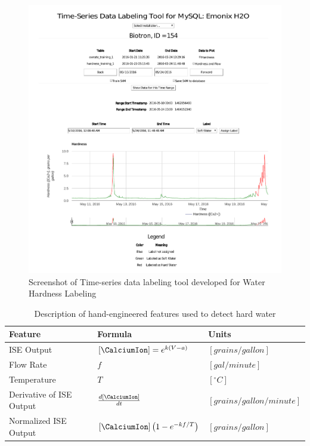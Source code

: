\begin{figure}[!t]
\includegraphics[width=\textwidth]{water/hardnesslabelingtool2.pdf}
\caption{Screenshot of Time-series data labeling tool developed for Water Hardness Labeling}
\label{fig:hardnesslabelingtool}
\end{figure}

\begin{table}
\centering
    \begin{tabularx}{\textwidth}{l || X || X }
    \textbf{Feature} & \textbf{Formula} & \textbf{Units} \\
    \hline
    ISE Output &  $[\CalciumIon] = e^{k (V - a)}$ & $[grains/gallon]$ \\
    Flow Rate &  $f$ & $[gal/minute]$ \\
    Temperature & $T$ & $[^\circ C]$ \\
    Derivative of ISE Output & $\frac{d [\CalciumIon]}{dt}$ & $[grains/gallon/minute]$ \\
    Normalized ISE Output & $[\CalciumIon] \left(  1 - e^{-k f / T}\right) $ & $[grains/gallon]$ \\
    \end{tabularx}
\caption{Description of hand-engineered features used to detect hard water}
\label{tab:features_hard_water}
\end{table}

